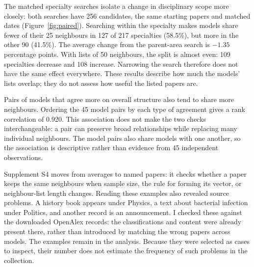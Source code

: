\documentclass[12pt]{article}
\begin{document}
The matched specialty searches isolate a change in disciplinary scope more closely: both searches have 256 candidates, the same starting papers and matched dates (Figure~\ref{fig:paired}). Searching within the specialty makes models share fewer of their 25 neighbours in 127 of 217 specialties (58.5\%), but more in the other 90 (41.5\%). The average change from the parent-area search is $-1.35$ percentage points. With lists of 50 neighbours, the split is almost even: 109 specialties decrease and 108 increase. Narrowing the search therefore does not have the same effect everywhere. These results describe how much the models' lists overlap; they do not assess how useful the listed papers are.

Pairs of models that agree more on overall structure also tend to share more neighbours. Ordering the 45 model pairs by each type of agreement gives a rank correlation of 0.920. This association does not make the two checks interchangeable: a pair can preserve broad relationships while replacing many individual neighbours. The model pairs also share models with one another, so the association is descriptive rather than evidence from 45 independent observations.

Supplement S4 moves from averages to named papers: it checks whether a paper keeps the same neighbours when sample size, the rule for forming its vector, or neighbour-list length changes. Reading these examples also revealed source problems. A history book appears under Physics, a text about bacterial infection under Politics, and another record is an announcement. I checked these against the downloaded OpenAlex records: the classifications and content were already present there, rather than introduced by matching the wrong papers across models. The examples remain in the analysis. Because they were selected as cases to inspect, their number does not estimate the frequency of such problems in the collection.
\end{document}
